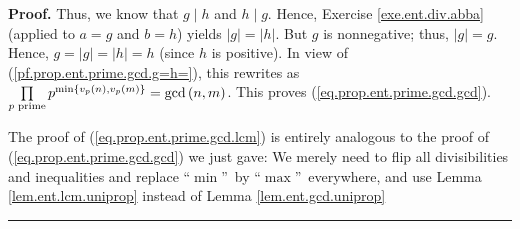 \documentclass[numbers=enddot,12pt,final,onecolumn,notitlepage]{scrartcl}%
\numberwithin{exer}{subsection}
\theoremstyle{definition}
\newenvironment{proof}[1][Proof]{\noindent\textbf{#1.} }{\ \rule{0.5em}{0.5em}}
\let\prodnonlimits\prod
\renewcommand{\prod}{\prodnonlimits\limits}
\begin{document}
\begin{proof}
Thus, we know that $g\mid h$ and $h\mid g$. Hence, Exercise
\ref{exe.ent.div.abba} (applied to $a=g$ and $b=h$) yields $\left\vert
g\right\vert =\left\vert h\right\vert $. But $g$ is nonnegative; thus,
$\left\vert g\right\vert =g$. Hence, $g=\left\vert g\right\vert =\left\vert
h\right\vert =h$ (since $h$ is positive). In view of
(\ref{pf.prop.ent.prime.gcd.g=h=}), this rewrites as $\prod\limits_{p\text{
prime}}p^{\min\left\{  v_{p}\left(  n\right)  ,v_{p}\left(  m\right)
\right\}  }=\gcd\left(  n,m\right)  $. This proves
(\ref{eq.prop.ent.prime.gcd.gcd}).

The proof of (\ref{eq.prop.ent.prime.gcd.lcm}) is entirely analogous to the
proof of (\ref{eq.prop.ent.prime.gcd.gcd}) we just gave: We merely need to
flip all divisibilities and inequalities and replace \textquotedblleft$\min
$\textquotedblright\ by \textquotedblleft$\max$\textquotedblright\ everywhere,
and use Lemma \ref{lem.ent.lcm.uniprop} instead of Lemma
\ref{lem.ent.gcd.uniprop}
\end{proof}
\end{document}
